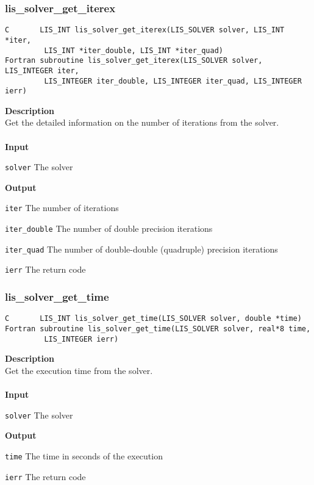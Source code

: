 \documentclass[a4paper]{article}
\newcommand{\namelistlabel}[1]{\mbox{#1}\hfill}
\newenvironment{namelist}[1]{%
\begin{list}{}
  {\let\makelabel\namelistlabel
  \settowidth{\labelwidth}{#1}
  \setlength{\leftmargin}{1.1\labelwidth}}
  }{%
\end{list}}
\begin{document}
\newpage
\subsubsection{lis\_solver\_get\_iterex}
\begin{screen}
\verb|C       LIS_INT lis_solver_get_iterex(LIS_SOLVER solver, LIS_INT *iter,|\\
\verb|         LIS_INT *iter_double, LIS_INT *iter_quad)|\\
\verb|Fortran subroutine lis_solver_get_iterex(LIS_SOLVER solver, LIS_INTEGER iter,|\\
\verb|         LIS_INTEGER iter_double, LIS_INTEGER iter_quad, LIS_INTEGER ierr)|
\end{screen}
{\bf Description}\\
\indent
Get the detailed information on the number of iterations from the solver.
\\ \\
\noindent
{\bf Input}
\begin{namelist}{XXXXXXXXXXXXXXXXXXXX}
\item[\tt solver] The solver
\end{namelist}
{\bf Output}
\begin{namelist}{XXXXXXXXXXXXXXXXXXXX}
\item[\tt iter] The number of iterations
\item[\tt iter\_double] The number of double precision iterations
\item[\tt iter\_quad] The number of double-double (quadruple) precision iterations
\item[\tt ierr] The return code
\end{namelist}

\subsubsection{lis\_solver\_get\_time}
\begin{screen}
\verb|C       LIS_INT lis_solver_get_time(LIS_SOLVER solver, double *time)|\\
\verb|Fortran subroutine lis_solver_get_time(LIS_SOLVER solver, real*8 time,|\\
\verb|         LIS_INTEGER ierr)|
\end{screen}
{\bf Description}\\
\indent
Get the execution time from the solver.
\\ \\
\noindent
{\bf Input}
\begin{namelist}{XXXXXXXXXXXXXXXXXXXX}
\item[\tt solver] The solver
\end{namelist}
{\bf Output}
\begin{namelist}{XXXXXXXXXXXXXXXXXXXX}
\item[\tt time] The time in seconds of the execution
\item[\tt ierr] The return code
\end{namelist}
\end{document}

